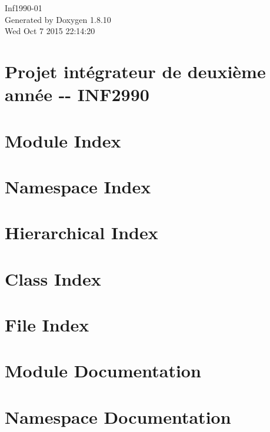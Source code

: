 \documentclass[twoside]{book}
\newcommand{\+}{\discretionary{\mbox{\scriptsize$\hookleftarrow$}}{}{}}
\newcommand{\clearemptydoublepage}{%
  \newpage{\pagestyle{empty}\cleardoublepage}%
}
\begin{document}
\hypersetup{pageanchor=false,
             bookmarks=true,
             bookmarksnumbered=true,
             pdfencoding=unicode
            }
\begin{titlepage}
\vspace*{7cm}
\begin{center}%
{\Large Inf1990-\/01 }\\
\vspace*{1cm}
{\large Generated by Doxygen 1.8.10}\\
\vspace*{0.5cm}
{\small Wed Oct 7 2015 22:14:20}\\
\end{center}
\end{titlepage}
\clearemptydoublepage
\tableofcontents
\clearemptydoublepage
{}
\hypersetup{pageanchor=true}

\chapter{Projet intégrateur de deuxième année -\/-\/ I\+N\+F2990}
\label{index}\hypertarget{index}{}
\chapter{Module Index}

\chapter{Namespace Index}

\chapter{Hierarchical Index}

\chapter{Class Index}

\chapter{File Index}

\chapter{Module Documentation}





\chapter{Namespace Documentation}






\end{document}
